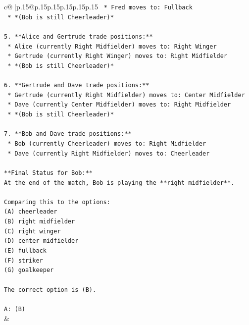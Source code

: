 \documentclass{article}
\begin{document}
{\begin{supertabular}{c@{$\;$}|p{.15\linewidth}@{}p{.15\linewidth}p{.15\linewidth}p{.15\linewidth}p{.15\linewidth}p{.15\linewidth}}
{{{\texttt{    *   Fred moves to: Fullback} \\
\texttt{    *   *(Bob is still Cheerleader)*} \\
\\ 
\texttt{5.  **Alice and Gertrude trade positions:**} \\
\texttt{    *   Alice (currently Right Midfielder) moves to: Right Winger} \\
\texttt{    *   Gertrude (currently Right Winger) moves to: Right Midfielder} \\
\texttt{    *   *(Bob is still Cheerleader)*} \\
\\ 
\texttt{6.  **Gertrude and Dave trade positions:**} \\
\texttt{    *   Gertrude (currently Right Midfielder) moves to: Center Midfielder} \\
\texttt{    *   Dave (currently Center Midfielder) moves to: Right Midfielder} \\
\texttt{    *   *(Bob is still Cheerleader)*} \\
\\ 
\texttt{7.  **Bob and Dave trade positions:**} \\
\texttt{    *   Bob (currently Cheerleader) moves to: Right Midfielder} \\
\texttt{    *   Dave (currently Right Midfielder) moves to: Cheerleader} \\
\\ 
\texttt{**Final Status for Bob:**} \\
\texttt{At the end of the match, Bob is playing the **right midfielder**.} \\
\\ 
\texttt{Comparing this to the options:} \\
\texttt{(A) cheerleader} \\
\texttt{(B) right midfielder} \\
\texttt{(C) right winger} \\
\texttt{(D) center midfielder} \\
\texttt{(E) fullback} \\
\texttt{(F) striker} \\
\texttt{(G) goalkeeper} \\
\\ 
\texttt{The correct option is (B).} \\
\\ 
\texttt{A: (B)} \\
            }
        }
    }
    & \\ \\


\end{supertabular}}
\end{document}
